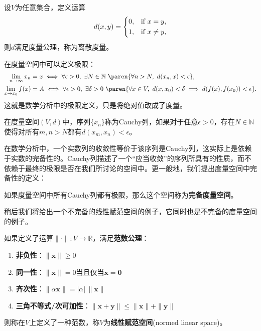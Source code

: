 \begin{example}[离散度量]
    设$V$为任意集合，定义运算
    \begin{equation}
        d(x,y) = \begin{dcases}
            0, & \text{if } x = y, \\
            1, & \text{if } x \neq y,
        \end{dcases}
    \end{equation}
    则$d$满足度量公理，称为离散度量。
\end{example}

在度量空间中可以定义极限：
\begin{align}
    \lim_{n\to\infty}x_n&=x\iff \forall \epsilon>0,\ \exists N\in\mathbb{N}\ \paren{\forall n>N,\ d(x_n,x)<\epsilon},\\
    \lim_{x\to x_0}f(x)&=A\iff \forall \epsilon>0,\ \exists \delta>0\ \paren{\forall x\in V,\ d(x,x_0)<\delta\implies d(f(x),f(x_0))<\epsilon}.
\end{align}
这就是数学分析中的极限定义，只是将绝对值改成了度量。

\begin{definition}[Cauchy列]
    在度量空间$(V,d)$中，序列$\{x_n\}$称为Cauchy列，如果对于任意$\epsilon>0$，存在$N\in\mathbb{N}$使得对所有$m,n>N$都有$d(x_m,x_n)<\epsilon$。
\end{definition}
在数学分析中，一个实数列的收敛性等价于该序列是Cauchy列，这实际上是依赖于实数的完备性的。Cauchy列描述了一个“应当收敛”的序列所具有的性质，而不依赖于最终的极限是否在我们所讨论的空间中。更一般地，我们提出度量空间中完备性的定义：

\begin{definition}[完备度量空间]
    如果度量空间中所有Cauchy列都有极限，那么这个空间称为\textbf{完备度量空间}。
\end{definition}

稍后我们将给出一个不完备的线性赋范空间的例子，它同时也是不完备的度量空间的例子。

\begin{definition}[范数]
    如果定义了运算$\|\cdot \| :V\rightarrow \mathbb{R}$，满足\textbf{范数公理}：
    \begin{enumerate}
        \item \textbf{非负性}：$\|\mathbf{x}\| \geq 0$
        \item \textbf{同一性}：$\|\mathbf{x}\| = 0$当且仅当$\mathbf{x} = \mathbf{0}$
        \item \textbf{齐次性}：$\|\alpha \mathbf{x}\| = |\alpha| \, \|\mathbf{x}\|$
        \item \textbf{三角不等式/次可加性}：$\|\mathbf{x} + \mathbf{y}\| \leq \|\mathbf{x}\| + \|\mathbf{y}\|$
    \end{enumerate}
    则称在$V$上定义了一种范数，称$V$为\textbf{线性赋范空间}(normed linear space)。
\end{definition}

